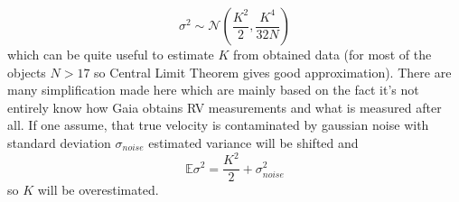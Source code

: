 \documentclass{pracalicmgr}
\begin{document}
\begin{appendices}
\begin{equation}
    \sigma^2 \sim \mathcal{N}\left(\frac{K^2}{2},\frac{K^4}{32N}\right)
\end{equation}
which can be quite useful to estimate $K$ from obtained data (for most of the objects $N>17$ so Central Limit Theorem gives good approximation).
There are many simplification made here which are mainly based on the fact it's not entirely know how Gaia obtains RV measurements and what is measured after all.
If one assume, that true velocity is contaminated by gaussian noise with standard deviation $\sigma_{noise}$ estimated variance will be shifted and 
\begin{equation}
    \mathbb{E} \sigma^2 = \frac{K^2}{2}+\sigma_{noise}^2
\end{equation} 
so $K$ will be overestimated.
    \end{appendices}
\end{document}
